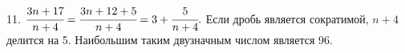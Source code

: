 11. $\cfrac{3n+17}{n+4}=\cfrac{3n+12+5}{n+4}=3+\cfrac{5}{n+4}.$ Если дробь является сократимой, $n+4$ делится на 5. Наибольшим таким двузначным числом является 96.\\
